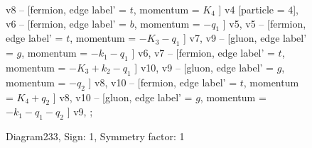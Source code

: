 \documentclass{revtex4}
\begin{document}
\begin{figure}[!htb]
\begin{center}
{v8 -- [fermion, edge label' = \(t\), momentum = \(K_{4}\) ] v4 [particle = \(4\)], 
v6 -- [fermion, edge label' = \(b\), momentum = \(-q_{1}\) ] v5, 
v5 -- [fermion, edge label' = \(t\), momentum = \(-K_{3} - q_{1}\) ] v7, 
v9 -- [gluon, edge label' = \(g\), momentum = \(-k_{1} - q_{1}\) ] v6, 
v7 -- [fermion, edge label' = \(t\), momentum = \(-K_{3} + k_{2} - q_{1}\) ] v10, 
v9 -- [gluon, edge label' = \(g\), momentum = \(-q_{2}\) ] v8, 
v10 -- [fermion, edge label' = \(t\), momentum = \(K_{4} + q_{2}\) ] v8, 
v10 -- [gluon, edge label' = \(g\), momentum = \(-k_{1} - q_{1} - q_{2}\) ] v9, 
};
\end{center}
\caption{Diagram233, Sign: 1, Symmetry factor: 1}
\end{figure}
\newpage
\end{document}
